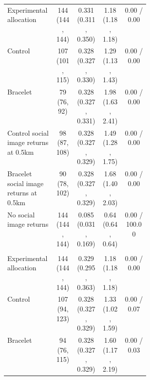 \begin{longtable}{p{0.34\linewidth}cccc}
Experimental allocation & \makecell[c]{144\\(144, 144)} & \makecell[c]{0.331\\(0.311, 0.350)} & \makecell[c]{1.18\\(1.18, 1.18)} & 0.00 / 0.00 \\
Control & \makecell[c]{107\\(101, 115)} & \makecell[c]{0.328\\(0.327, 0.330)} & \makecell[c]{1.29\\(1.13, 1.43)} & 0.00 / 0.00 \\
Bracelet & \makecell[c]{79\\(76, 92)} & \makecell[c]{0.328\\(0.327, 0.331)} & \makecell[c]{1.98\\(1.63, 2.41)} & 0.00 / 0.00 \\
Control social image returns at 0.5km & \makecell[c]{98\\(87, 108)} & \makecell[c]{0.328\\(0.327, 0.329)} & \makecell[c]{1.49\\(1.28, 1.75)} & 0.00 / 0.00 \\
Bracelet social image returns at 0.5km & \makecell[c]{90\\(78, 102)} & \makecell[c]{0.328\\(0.327, 0.329)} & \makecell[c]{1.68\\(1.40, 2.03)} & 0.00 / 0.00 \\
No social image returns & \makecell[c]{144\\(144, 144)} & \makecell[c]{0.085\\(0.031, 0.169)} & \makecell[c]{0.64\\(0.64, 0.64)} & 0.00 / 100.00 \\
\addlinespace
\multicolumn{5}{l}{\textit{Cluster random shock}} \\
Experimental allocation & \makecell[c]{144\\(144, 144)} & \makecell[c]{0.329\\(0.295, 0.363)} & \makecell[c]{1.18\\(1.18, 1.18)} & 0.00 / 0.00 \\
Control & \makecell[c]{107\\(94, 123)} & \makecell[c]{0.328\\(0.327, 0.329)} & \makecell[c]{1.33\\(1.02, 1.59)} & 0.00 / 0.07 \\
Bracelet & \makecell[c]{94\\(76, 115)} & \makecell[c]{0.328\\(0.327, 0.329)} & \makecell[c]{1.60\\(1.17, 2.19)} & 0.00 / 0.03 \\

\end{longtable}
